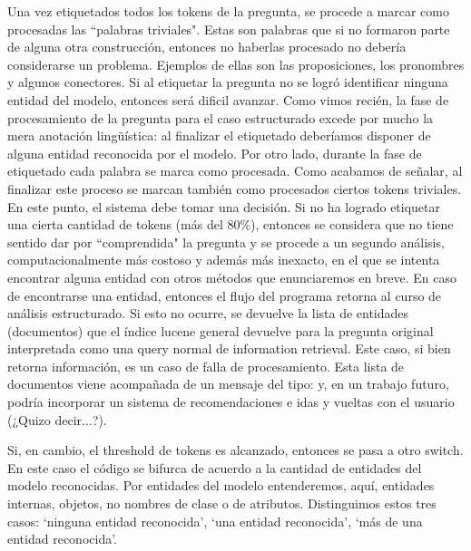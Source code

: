 Una vez etiquetados todos los tokens de la pregunta, se procede a marcar como procesadas las ``palabras triviales". Estas son palabras que si no formaron parte de alguna otra construcción, entonces no haberlas procesado no debería considerarse un problema. Ejemplos de ellas son las proposiciones, los pronombres y algunos conectores. Si al etiquetar la pregunta no se logró identificar ninguna entidad del modelo, entonces será dificil avanzar. Como vimos recién, la fase de procesamiento de la pregunta para el caso estructurado excede por mucho la mera anotación lingüística: al finalizar el etiquetado deberíamos disponer de alguna entidad reconocida por el modelo. Por otro lado, durante la fase de etiquetado cada palabra se marca como procesada. Como acabamos de señalar, al finalizar este proceso se marcan también como procesados ciertos tokens triviales. En este punto, el sistema debe tomar una decisión. Si no ha logrado etiquetar una cierta cantidad de tokens (más del 80\%), entonces se considera que no tiene sentido dar por ``comprendida" la pregunta y se procede a un segundo análisis, computacionalmente más costoso y además más inexacto, en el que se intenta encontrar alguna entidad con otros métodos que enunciaremos en breve. En caso de encontrarse una entidad, entonces el flujo del programa retorna al curso de análisis estructurado. Si esto no ocurre, se devuelve la lista de entidades (documentos) que el índice lucene general devuelve para la pregunta original interpretada como una query normal de information retrieval. Este caso, si bien retorna información, es un caso de falla de procesamiento. Esta lista de documentos viene acompañada de un mensaje del tipo:  y, en un trabajo futuro, podría incorporar un sistema de recomendaciones e idas y vueltas con el usuario (¿Quizo decir...?).

Si, en cambio, el threshold de tokens es alcanzado, entonces se pasa a otro switch. En este caso el código se bifurca de acuerdo a la cantidad de entidades del modelo reconocidas. Por entidades del modelo entenderemos, aquí, entidades internas, objetos, no nombres de clase o de atributos. Distinguimos estos tres casos: `ninguna entidad reconocida', `una entidad reconocida', `más de una entidad reconocida'.


